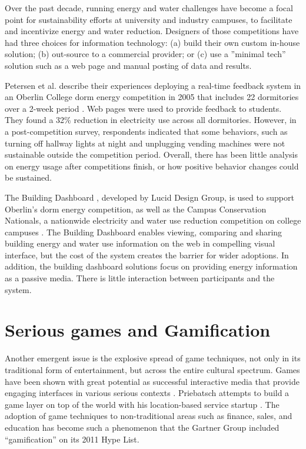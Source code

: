 Over the past decade, running energy and water challenges have become a focal point for sustainability efforts at university and industry campuses, to facilitate and incentivize energy and water reduction. Designers of those competitions
have had three choices for information technology: (a) build their own custom in-house solution;
(b) out-source to a commercial provider; or (c) use a ”minimal tech” solution such as a web page
and manual posting of data and results.

Petersen et al. describe their experiences deploying a real-time feedback
system in an Oberlin College dorm energy competition in 2005 that includes 22
dormitories over a 2-week period \cite{petersen-dorm-energy-reduction}. Web
pages were used to provide feedback to students. They found a 32\% reduction in
electricity use across all dormitories. However, in a post-competition survey,
respondents indicated that some behaviors, such as turning off hallway lights
at night and unplugging vending machines were not sustainable outside the
competition period.  Overall, there has been little analysis on energy usage
after competitions finish, or how positive behavior changes could be sustained.

The Building Dashboard \cite{building-dashboard}, developed by Lucid Design
Group, is used to support Oberlin's dorm energy competition,
as well as the Campus Conservation Nationals, a nationwide electricity and
water use reduction competition on college campuses \cite{competetoreduce}.
The Building Dashboard enables viewing, comparing and sharing building energy
and water use information on the web in compelling visual interface, but the
cost of the system creates the barrier for wider adoptions. In addition, the
building dashboard solutions focus on providing energy information as
a passive media. There is little interaction between participants and the system.

\section{Serious games and Gamification}
Another emergent issue is the explosive spread of game techniques, not only in
its traditional form of entertainment, but across the entire cultural spectrum.
Games have been shown with great potential as successful
interactive media that provide engaging interfaces in various serious contexts
\cite{mcgonigal2011reality,reeves2009total}. Priebatsch attempts to build a
game layer on top of the world with his location-based service startup
\cite{Priebatsch2010ted}. The adoption of game techniques to non-traditional areas such as finance,
sales, and education has become such a phenomenon that the Gartner Group
included ``gamification'' \cite{Deterding2011mt} on its 2011 Hype List.

